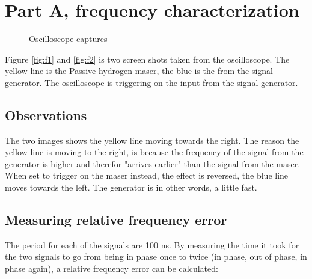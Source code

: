 \documentclass[11pt,english,a4paper]{article}
\begin{document}
\section{Part A, frequency characterization}
\begin{figure}[!htb]
  \centering
  \hfill
  \caption{Oscilloscope captures}
\end{figure}
Figure \ref{fig:f1} and \ref{fig:f2} is two screen shots taken from the oscilloscope. The yellow line is the Passive hydrogen maser, the blue is the from the signal generator. The oscilloscope is triggering on the input from the signal generator. 

\subsection{Observations}
The two images shows the yellow line moving towards the right. The reason the yellow line is moving to the right, is because the frequency of the signal from the generator is higher and therefor "arrives earlier" than the signal from the maser. When set to trigger on the maser instead, the effect is reversed, the blue line moves towards the left. The generator is in other words, a little fast. 

\subsection{Measuring relative frequency error}
The period for each of the signals are 100 ns. By measuring the time it took for the two signals to go from being in phase once to twice (in phase, out of phase, in phase again), a relative frequency error can be calculated:
\end{document}
